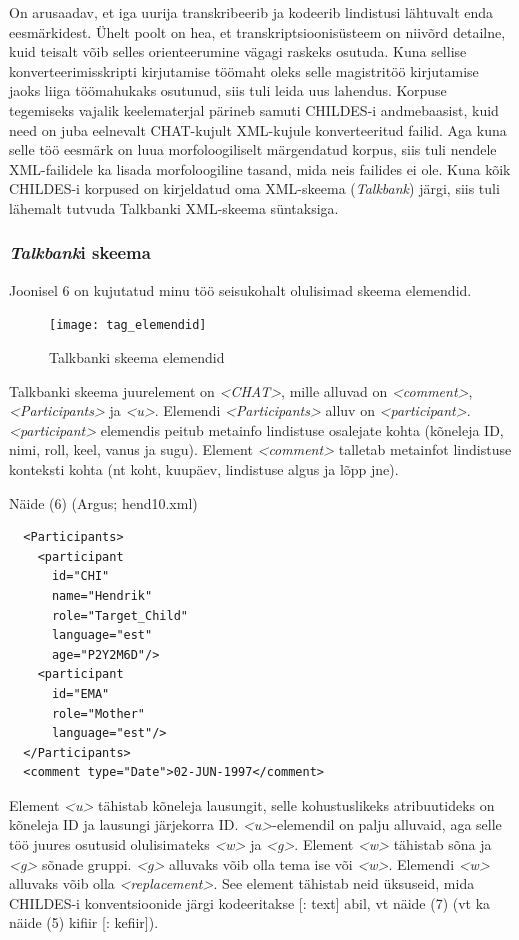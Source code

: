\documentclass[12pt]{article}
\begin{document}
\hfill

On arusaadav, et iga uurija transkribeerib ja kodeerib lindistusi lähtuvalt enda eesmärkidest. Ühelt poolt on hea, et transkriptsioonisüsteem on niivõrd detailne, kuid teisalt võib selles orienteerumine vägagi raskeks osutuda. Kuna sellise konverteerimisskripti kirjutamise töömaht oleks selle magistritöö kirjutamise jaoks liiga töömahukaks osutunud, siis tuli leida uus lahendus. Korpuse tegemiseks vajalik keelematerjal pärineb samuti CHILDES-i andmebaasist, kuid need on juba eelnevalt CHAT-kujult XML-kujule konverteeritud failid. Aga kuna selle töö eesmärk on luua morfoloogiliselt märgendatud korpus, siis tuli nendele XML-failidele ka lisada morfoloogiline tasand, mida neis failides ei ole. Kuna kõik CHILDES-i korpused on kirjeldatud oma XML-skeema (\emph{Talkbank}) järgi, siis tuli lähemalt tutvuda Talkbanki XML-skeema süntaksiga.

\subsubsection{\emph{Talkbank}i skeema}

Joonisel 6 on kujutatud minu töö seisukohalt olulisimad skeema elemendid.

\begin{figure}[H]
    \centering
    \texttt{[image: tag\_elemendid]}
    \caption{Talkbanki skeema elemendid}
\end{figure}

Talkbanki skeema juurelement on \emph{<CHAT>}, mille alluvad on \emph{<comment>}, \emph{<Participants>} ja \emph{<u>}. Elemendi \emph{<Participants>} alluv on \emph{<participant>}. \emph{<participant>} elemendis peitub metainfo lindistuse osalejate kohta (kõneleja ID, nimi, roll, keel, vanus ja sugu). Element \emph{<comment>} talletab metainfot lindistuse konteksti kohta (nt koht, kuupäev, lindistuse algus ja lõpp jne).

Näide (6) (Argus; hend10.xml)
\begin{lstlisting}
  <Participants>
    <participant
      id="CHI"
      name="Hendrik"
      role="Target_Child"
      language="est"
      age="P2Y2M6D"/>
    <participant
      id="EMA"
      role="Mother"
      language="est"/>
  </Participants>
  <comment type="Date">02-JUN-1997</comment>
\end{lstlisting}

Element \emph{<u>} tähistab kõneleja lausungit, selle kohustuslikeks atribuutideks on kõneleja ID ja lausungi järjekorra ID. \emph{<u>}-elemendil on palju alluvaid, aga selle töö juures osutusid olulisimateks \emph{<w>} ja \emph{<g>}. Element \emph{<w>} tähistab sõna ja \emph{<g>} sõnade gruppi. \emph{<g>} alluvaks võib olla tema ise või \emph{<w>}. Elemendi \emph{<w>} alluvaks võib olla \emph{<replacement>}. See element tähistab neid üksuseid, mida CHILDES-i konventsioonide järgi kodeeritakse [: text] abil, vt näide (7) (vt ka näide (5) kifiir [: kefiir]).
\end{document}
